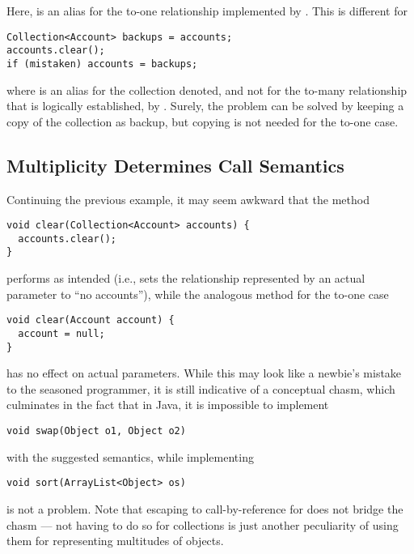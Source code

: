 {\noindent Here,  is an alias for the to-one relationship
implemented by . This is different for

\begin{lstlisting}
Collection<Account> backups = accounts;
accounts.clear();
if (mistaken) accounts = backups;
\end{lstlisting}

\noindent where  is an alias for the collection denoted, and
not for the to-many relationship that is logically established, by
. Surely, the problem can be solved by keeping a copy of the
collection as backup, but copying is not needed for the to-one case.

\subsection{Multiplicity Determines Call Semantics}
\label{section2.6}

\noindent Continuing the previous example, it may seem awkward that the
method

\begin{lstlisting}
void clear(Collection<Account> accounts) {
  accounts.clear();
}
\end{lstlisting}

\noindent performs as intended (i.e., sets the relationship represented by
an actual parameter to ``no accounts''), while the analogous method for
the to-one case

\begin{lstlisting}
void clear(Account account) {
  account = null;
}
\end{lstlisting}

\noindent has no effect on actual parameters. While this may look like a
newbie's mistake to the seasoned programmer, it is still indicative of
a conceptual chasm, which culminates in the fact that in Java, it is
impossible to implement

\begin{lstlisting}
void swap(Object o1, Object o2)
\end{lstlisting}

\noindent with the suggested semantics, while implementing

\begin{lstlisting}
void sort(ArrayList<Object> os)
\end{lstlisting}

\noindent is not a problem. Note that escaping to call-by-reference for
 does not bridge the chasm --- not having to do so for collections
is just another peculiarity of using them for representing multitudes of
objects.

}
